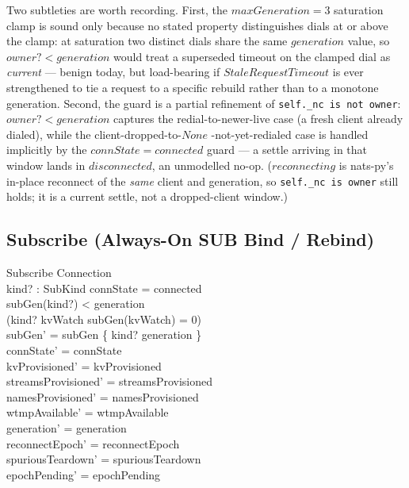 \documentclass[a4paper,10pt,fleqn]{article}
\begin{document}
Two subtleties are worth recording.  First, the $maxGeneration = 3$
saturation clamp is sound only because no stated property
distinguishes dials at or above the clamp: at saturation two
distinct dials share the same $generation$ value, so $owner? <
generation$ would treat a superseded timeout on the clamped dial as
\emph{current} --- benign today, but load-bearing if
$StaleRequestTimeout$ is ever strengthened to tie a request to a
specific rebuild rather than to a monotone generation.  Second, the
guard is a partial refinement of \texttt{self.\_nc is not owner}:
$owner? < generation$ captures the redial-to-newer-live case (a
fresh client already dialed), while the client-dropped-to-$None$
-not-yet-redialed case is handled implicitly by the $connState =
connected$ guard --- a settle arriving in that window lands in
$disconnected$, an unmodelled no-op.  ($reconnecting$ is nats-py's
in-place reconnect of the \emph{same} client and generation, so
\texttt{self.\_nc is owner} still holds; it is a current settle, not a
dropped-client window.)

\subsection{Subscribe (Always-On SUB Bind / Rebind)}

\begin{schema}{Subscribe}
  \Delta Connection \\
  kind? : SubKind
  \where
  connState = connected \\
  subGen(kind?) < generation \\
  (kind? \neq kvWatch \lor subGen(kvWatch) = 0) \\
  subGen' = subGen \oplus \{ kind? \mapsto generation \} \\
  connState' = connState \\
  kvProvisioned' = kvProvisioned \\
  streamsProvisioned' = streamsProvisioned \\
  namesProvisioned' = namesProvisioned \\
  wtmpAvailable' = wtmpAvailable \\
  generation' = generation \\
  reconnectEpoch' = reconnectEpoch \\
  spuriousTeardown' = spuriousTeardown \\
  epochPending' = epochPending
\end{schema}
\end{document}
